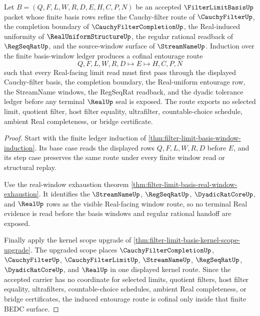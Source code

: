 \begin{theorem}
\label{thm:filter-limit-basis-cofinal-cauchy-entourage-induction}
Let $B=(Q,F,L,W,R,D,E,H,C,P,N)$ be an accepted $\FilterLimitBasisUp$ packet whose finite basis rows refine the Cauchy-filter route of $\CauchyFilterUp$, the completion boundary of $\CauchyFilterCompletionUp$, the Real-induced uniformity of $\RealUniformStructureUp$, the regular rational readback of $\RegSeqRatUp$, and the source-window surface of $\StreamNameUp$. Induction over the finite basis-window ledger produces a cofinal entourage route
$$
Q,F,L,W,R,D \longmapsto E \longmapsto H,C,P,N
$$
such that every Real-facing limit read must first pass through the displayed Cauchy-filter basis, the completion boundary, the Real-uniform entourage row, the StreamName windows, the RegSeqRat readback, and the dyadic tolerance ledger before any terminal $\RealUp$ seal is exposed. The route exports no selected limit, quotient filter, host filter equality, ultrafilter, countable-choice schedule, ambient Real completeness, or bridge certificate.
\end{theorem}
\begin{proof}
Start with the finite ledger induction of \autoref{thm:filter-limit-basis-window-induction}. Its base case reads the displayed rows $Q,F,L,W,R,D$ before $E$, and its step case preserves the same route under every finite window read or structural replay.

Use the real-window exhaustion theorem \autoref{thm:filter-limit-basis-real-window-exhaustion}. It identifies the $\StreamNameUp$, $\RegSeqRatUp$, $\DyadicRatCoreUp$, and $\RealUp$ rows as the visible Real-facing window route, so no terminal Real evidence is read before the basis windows and regular rational handoff are exposed.

Finally apply the kernel scope upgrade of \autoref{thm:filter-limit-basis-kernel-scope-upgrade}. The upgraded scope places $\CauchyFilterCompletionUp$, $\CauchyFilterUp$, $\CauchyFilterLimitUp$, $\StreamNameUp$, $\RegSeqRatUp$, $\DyadicRatCoreUp$, and $\RealUp$ in one displayed kernel route. Since the accepted carrier has no coordinate for selected limits, quotient filters, host filter equality, ultrafilters, countable-choice schedules, ambient Real completeness, or bridge certificates, the induced entourage route is cofinal only inside that finite BEDC surface.
\end{proof}

